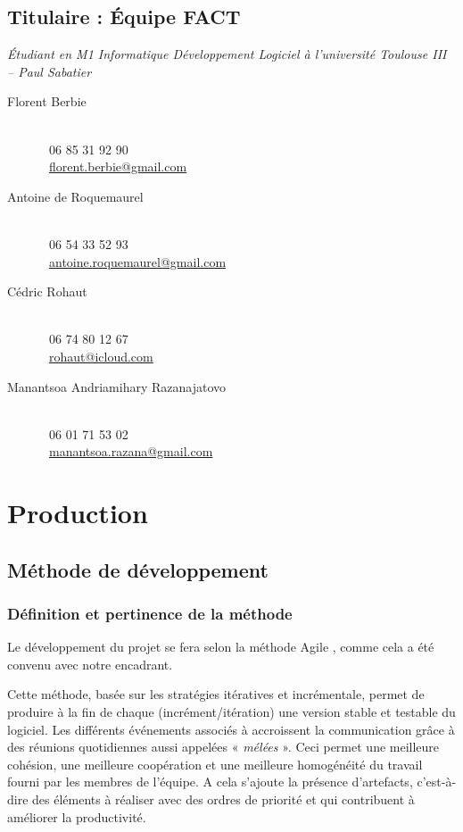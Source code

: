 	\subsection{Titulaire : Équipe FACT}
	\textit{Étudiant en M1 Informatique Développement Logiciel à l'université Toulouse III -- Paul Sabatier}
	\begin{description}
		\item[Florent Berbie]~ \\
	\Telefon~06 85 31 92 90 \\
	\Letter~\href{mailto:florent.berbie@gmail.com}{florent.berbie@gmail.com} \\
	
\item[Antoine de Roquemaurel] ~\\
	\Telefon~06 54 33 52 93\\
	\Letter~\href{mailto:antoine.roquemaurel@gmail.com}{antoine.roquemaurel@gmail.com} \\
	
\item[Cédric Rohaut]~\\ 
	\Telefon~06 74 80 12 67\\
	\Letter~\href{mailto:rohaut@icloud.com}{rohaut@icloud.com} \\
	
\item[Manantsoa Andriamihary Razanajatovo] ~\\
	\Telefon~06 01 71 53 02\\
	\Letter~\href{mailto:manantsoa.razana@gmail.com}{manantsoa.razana@gmail.com}
\end{description}

\section{Production}
\subsection{Méthode de développement}
\subsubsection{Définition et pertinence de la méthode \scrum}
Le développement du projet se fera selon la méthode Agile \scrum{}, comme cela a été convenu avec notre encadrant.

Cette méthode, basée sur les stratégies itératives et incrémentale, permet de produire à la fin de chaque \sprint{} (incrément/itération) une
version stable et testable du logiciel. Les différents événements associés à \scrum{} accroissent la communication grâce à des réunions quotidiennes
aussi appelées « \textit{mélées} ». Ceci permet une meilleure cohésion, une meilleure coopération et une meilleure homogénéité du travail fourni par les
membres de l'équipe. A cela s'ajoute la présence d'artefacts, c'est-à-dire des éléments à réaliser avec des ordres de priorité et qui contribuent à
améliorer la productivité.
                    
